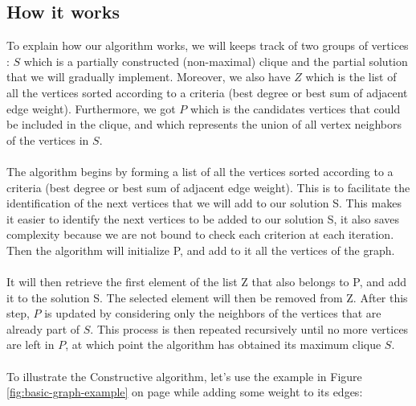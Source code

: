 
\subsection{How it works}

    To explain how our algorithm works, we will keeps track of two groups of vertices : $S$ which is a partially constructed (non-maximal) clique and the partial solution that we will gradually implement. Moreover, we also have $Z$ which is the list of all the vertices sorted according to a criteria (best degree or best sum of adjacent edge weight). Furthermore, we got $P$  which is the candidates vertices that could be included in the clique, and which represents the union of all vertex neighbors of the vertices in $S$.
    \\ \\
    The algorithm begins by forming a list of all the vertices sorted according to a criteria (best degree or best sum of adjacent edge weight). This is to facilitate the identification of the next vertices that we will add to our solution S. This makes it easier to identify the next vertices to be added to our solution S, it also saves complexity because we are not bound to check each criterion at each iteration. Then the algorithm will initialize P, and add to it all the vertices of the graph.
    \\ \\
    It will then retrieve the first element of the list Z that also belongs to P, and add it to the solution S. The selected element will then be removed from Z. After this step, $P$ is updated by considering only the neighbors of the vertices that are already part of $S$. This process is then repeated recursively until no more vertices are left in $P$, at which point the algorithm has obtained its maximum clique $S$.
    \\ \\
    To illustrate the Constructive algorithm, let's use the example in
    Figure \ref{fig:basic-graph-example} on page \pageref{fig:basic-graph-example} while adding some weight to its edges: \\

